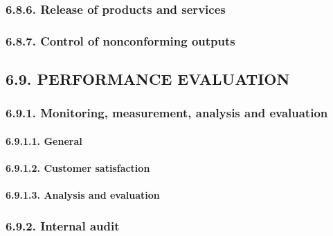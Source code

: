 \documentclass[
]{article}
\begin{document}
\hypertarget{release-of-products-and-services-1}{%
\subsubsection{6.8.6. Release of products and
services}\label{release-of-products-and-services-1}}

\hypertarget{control-of-nonconforming-outputs-1}{%
\subsubsection{6.8.7. Control of nonconforming
outputs}\label{control-of-nonconforming-outputs-1}}

\hypertarget{performance-evaluation-1}{%
\subsection{6.9. PERFORMANCE
EVALUATION}\label{performance-evaluation-1}}

\hypertarget{monitoring-measurement-analysis-and-evaluation-1}{%
\subsubsection{6.9.1. Monitoring, measurement, analysis and
evaluation}\label{monitoring-measurement-analysis-and-evaluation-1}}

\hypertarget{general-15}{%
\paragraph{6.9.1.1. General}\label{general-15}}

\hypertarget{customer-satisfaction-1}{%
\paragraph{6.9.1.2. Customer
satisfaction}\label{customer-satisfaction-1}}

\hypertarget{analysis-and-evaluation-1}{%
\paragraph{6.9.1.3. Analysis and
evaluation}\label{analysis-and-evaluation-1}}

\hypertarget{internal-audit-1}{%
\subsubsection{6.9.2. Internal audit}\label{internal-audit-1}}
\end{document}
